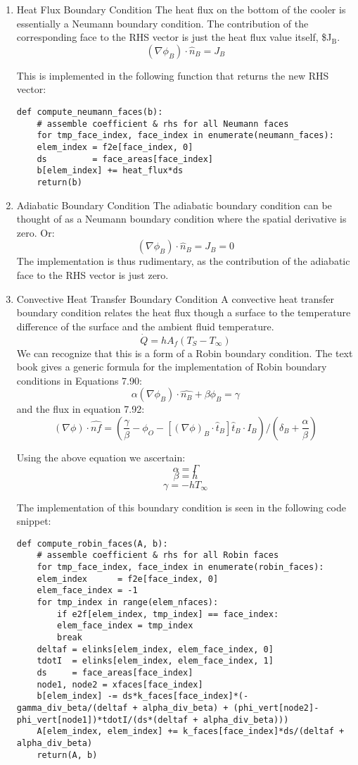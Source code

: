 \documentclass[11pt]{article}
\begin{document}
\begin{enumerate}
\item Heat Flux Boundary Condition
\label{sec:orgfd70d51}
The heat flux on the bottom of the cooler is essentially a Neumann boundary condition. The contribution of the corresponding face to the RHS vector is just the heat flux value itself, \$J\(_{\text{B}}\). 
\[
 (\nabla \phi_{B} ) \cdot \hat{n}_{B} = J_{B}
 \]

This is implemented in the following function that returns the new RHS vector:
\begin{verbatim}
def compute_neumann_faces(b):
    # assemble coefficient & rhs for all Neumann faces
    for tmp_face_index, face_index in enumerate(neumann_faces):
	elem_index = f2e[face_index, 0]
	ds         = face_areas[face_index]
	b[elem_index] += heat_flux*ds
    return(b)
\end{verbatim}
\item Adiabatic Boundary Condition
\label{sec:org1d2240d}
The adiabatic boundary condition can be thought of as a Neumann boundary condition where the spatial derivative is zero. Or:
\[
 (\nabla \phi_{B} ) \cdot \hat{n}_{B} = J_{B} = 0
 \]
The implementation is thus rudimentary, as the contribution of the adiabatic face to the RHS vector is just zero.
\item Convective Heat Transfer Boundary Condition
\label{sec:org1010037}
A convective heat transfer boundary condition relates the heat flux though a surface to the temperature difference of the surface and the ambient fluid temperature.
\[
 \dot{Q} = hA_{f}(T_{S}-T_{\infty})
 \]
We can recognize that this is a form of a Robin boundary condition. The text book gives a generic formula for the implementation of Robin boundary conditions in Equations 7.90:
\[
 \alpha ( \nabla \phi_{B}) \cdot \hat{n_{B}} + \beta \phi_{B} = \gamma 
 \] 
and the flux in equation 7.92:
\[
 ( \nabla \phi ) \cdot \hat{nf} =  \left( \frac{\gamma}{\beta} -\phi_{O} - [(\nabla \phi)_{B} \cdot \hat{t}_{B}] \hat{t}_{B} \cdot I_{B} \right) / \left( \delta_{B} + \frac{\alpha}{\beta} \right)
 \]

Using the above equation we ascertain:
\[ \alpha = \Gamma \] 
\[ \beta = h \] 
\[ \gamma = -h T_{\infty} \] 

The implementation of this boundary condition is seen in the following code snippet:
\begin{verbatim}
def compute_robin_faces(A, b):
    # assemble coefficient & rhs for all Robin faces
    for tmp_face_index, face_index in enumerate(robin_faces):
	elem_index      = f2e[face_index, 0]
	elem_face_index = -1
	for tmp_index in range(elem_nfaces):
	    if e2f[elem_index, tmp_index] == face_index:
		elem_face_index = tmp_index
		break
	deltaf = elinks[elem_index, elem_face_index, 0]
	tdotI  = elinks[elem_index, elem_face_index, 1]
	ds     = face_areas[face_index]
	node1, node2 = xfaces[face_index]
	b[elem_index] -= ds*k_faces[face_index]*(-gamma_div_beta/(deltaf + alpha_div_beta) + (phi_vert[node2]-phi_vert[node1])*tdotI/(ds*(deltaf + alpha_div_beta)))
	A[elem_index, elem_index] += k_faces[face_index]*ds/(deltaf + alpha_div_beta)
    return(A, b)
\end{verbatim}
\end{enumerate}
\end{document}
